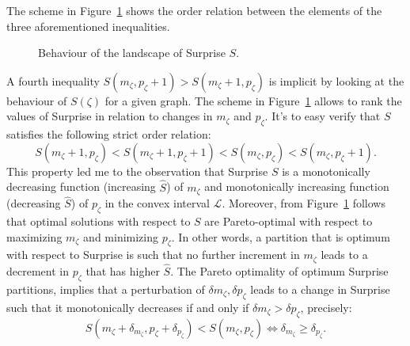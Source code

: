 The scheme in Figure~\ref{fig:surprisebehaviour} shows the order relation between the elements of the three aforementioned inequalities.
\begin{figure}[htb]
\centering
{}
\caption{Behaviour of the landscape of Surprise $S$.}
\label{fig:surprisebehaviour}
\end{figure}

A fourth inequality $S(m_\zeta,p_\zeta+1)>S(m_\zeta+1,p_\zeta)$ is implicit by looking at the behaviour of $S(\zeta)$ for a given graph. 
The scheme in Figure~\ref{fig:surprisebehaviour} allows to rank the values of Surprise in relation to changes in $m_\zeta$ and $p_\zeta$.
It's to easy verify that $S$ satisfies the following strict order relation:
\begin{equation}\label{eq:surpriseorderrelation}
S(m_\zeta+1,p_\zeta)<S(m_\zeta+1,p_\zeta+1)<S(m_\zeta,p_\zeta)<S(m_\zeta,p_\zeta+1).
\end{equation}
This property led me to the observation that Surprise $S$ is a monotonically decreasing function (increasing $\hat{S}$) of $m_\zeta$ and monotonically increasing function (decreasing $\hat{S}$) of $p_\zeta$ in the convex interval $\mathcal{L}$.
Moreover, from Figure~\ref{fig:surprisebehaviour} follows that optimal solutions with respect to $S$ are Pareto-optimal with respect to maximizing $m_\zeta$ and minimizing $p_\zeta$.
In other words, a partition that is optimum with respect to Surprise is such that no further increment in $m_\zeta$ leads to a decrement in $p_\zeta$ that has higher $\hat{S}$.
The Pareto optimality of optimum Surprise partitions, implies that a perturbation of $\delta m_\zeta, \delta p_\zeta$ leads to a change in Surprise such that it monotonically decreases if and only if $\delta m_\zeta > \delta p_\zeta$, precisely:
\begin{equation}\label{eq:resolution_limit_condition}
S(m_\zeta + \delta_{m_\zeta}, p_\zeta + \delta_{p_\zeta}) < S(m_\zeta,p_\zeta) \iff \delta_{m_\zeta} \geq \delta_{p_\zeta}.
\end{equation}

